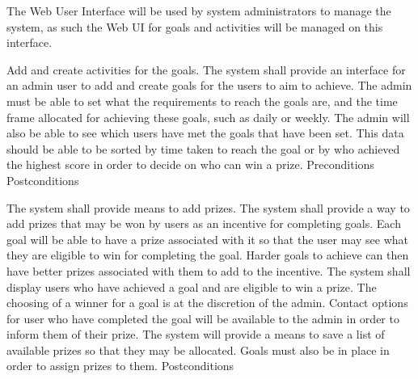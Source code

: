The Web User Interface will be used by system administrators to manage the system, as such the Web UI for goals and activities will be managed on this interface.

\FuncReq
{Add and create activities for the goals.}
{The system shall provide an interface for an admin user to add and create goals for the users to aim to achieve. The admin must be able to set what the requirements to reach the goals are, and the time frame allocated for achieving these goals, such as daily or weekly. The admin will also be able to see which users have met the goals that have been set. This data should be able  to be sorted by time taken to reach the goal or by who achieved the highest score in order to decide on who can win a prize.}
{Preconditions}
{Postconditions}

\FuncReq
{The system shall provide means to add prizes.}
{The system shall provide a way to add prizes that may be won by users as an incentive for completing goals. Each goal will be able to have a prize associated with it so that the user may see what they are eligible to win for completing the goal. Harder goals to achieve can then have better prizes associated with them to add to the incentive. The system shall display users who have achieved a goal and are eligible to win a prize. The choosing of a winner for a goal is at the discretion of the admin. Contact options for user who have completed the goal will be available to the admin in order to inform them of their prize.}
{The system will provide a means to save a list of available prizes so that they may be allocated. Goals must also be in place in order to assign prizes to them.}
{Postconditions}
